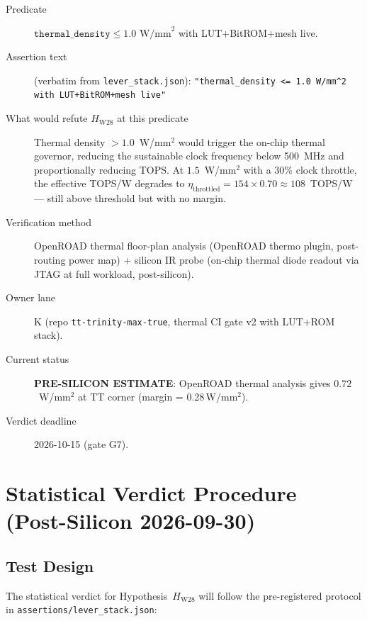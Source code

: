 \begin{description}
  \item[Predicate] \(\mathtt{thermal\_density}
    \leq 1.0\text{ W/mm}^{2}\) with LUT+BitROM+mesh live.
  \item[Assertion text] (verbatim from \texttt{lever\_stack.json}):
    \texttt{"thermal\_density <= 1.0 W/mm\^{}2 with LUT+BitROM+mesh live"}
  \item[What would refute \(H_{\mathrm{W28}}\) at this predicate]
    Thermal density \(> 1.0\)~W/mm\(^{2}\) would trigger the on-chip thermal
    governor, reducing the sustainable clock frequency below 500~MHz and
    proportionally reducing TOPS.  At \(1.5\)~W/mm\(^{2}\) with a 30\% clock
    throttle, the effective TOPS/W degrades to
    \(\eta_{\mathrm{throttled}} = 154 \times 0.70 \approx 108\)~TOPS/W ---
    still above threshold but with no margin.
  \item[Verification method] OpenROAD thermal floor-plan analysis (OpenROAD
    thermo plugin, post-routing power map) + silicon IR probe (on-chip thermal
    diode readout via JTAG at full workload, post-silicon).
  \item[Owner lane] K (repo \texttt{tt-trinity-max-true}, thermal CI gate v2
    with LUT+ROM stack).
  \item[Current status] \textbf{PRE-SILICON ESTIMATE}: OpenROAD thermal analysis
    gives \(0.72\)~W/mm\(^{2}\) at TT corner (margin = 0.28\,W/mm\(^{2}\)).
  \item[Verdict deadline] 2026-10-15 (gate G7).
\end{description}

\section{Statistical Verdict Procedure (Post-Silicon 2026-09-30)}
\label{sec:statistical_verdict}

\subsection{Test Design}

The statistical verdict for Hypothesis~\(H_{\mathrm{W28}}\) will follow
the pre-registered protocol in \texttt{assertions/lever\_stack.json}:

